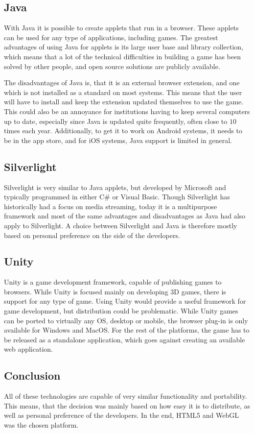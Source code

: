 \subsection{Java}
With Java it is possible to create applets that run in a browser.\cite{java13} These applets can be used for any type of applications, including games.
The greatest advantages of using Java for applets is its large user base and library collection, which means that a lot of the technical difficulties in building a game has been solved by other people, and open source solutions are publicly available.

The disadvantages of Java is, that it is an external browser extension, and one which is not installed as a standard on most systems.
This means that the user will have to install and keep the extension updated themselves to use the game. 
This could also be an annoyance for institutions having to keep several computers up to date, especially since Java is updated quite frequently, often close to $10$ times each year.\cite{javahistory13}
Additionally, to get it to work on Android systems, it needs to be in the app store, and for iOS systems, Java support is limited in general.

\subsection{Silverlight}
Silverlight is very similar to Java applets, but developed by Microsoft and typically programmed in either C\# or Visual Basic.\cite{silverlight13}
Though Silverlight has historically had a focus on media streaming, today it is a multipurpose framework and most of the same advantages and disadvantages as Java had also apply to Silverlight.
A choice between Silverlight and Java is therefore mostly based on personal preference on the side of the developers.

\subsection{Unity}
Unity is a game development framework, capable of publishing games to browsers.\cite{unity13} 
While Unity is focused mainly on developing 3D games, there is support for any type of game.
Using Unity would provide a useful framework for game development, but distribution could be problematic.
While Unity games can be ported to virtually any OS, desktop or mobile, the browser plug-in is only available for Windows and MacOS.
For the rest of the platforms, the game has to be released as a standalone application, which goes against creating an available web application.

\subsection{Conclusion}
All of these technologies are capable of very similar functionality and portability. This means, that the decision was mainly based on how easy it is to distribute, as well as personal preference of the developers.
In the end, HTML5 and WebGL was the chosen platform.